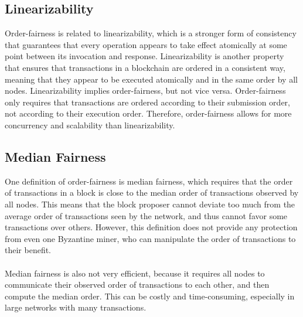 \documentclass{report}
\begin{document}
\subsection*{Linearizability}
Order-fairness is related to linearizability, which is a stronger form of consistency that guarantees that every operation appears to take effect atomically at some point between its invocation and response. Linearizability is another property that ensures that transactions in a blockchain are ordered in a consistent way, meaning that they appear to be executed atomically and in the same order by all nodes. Linearizability implies order-fairness, but not vice versa. Order-fairness only requires that transactions are ordered according to their submission order, not according to their execution order. Therefore, order-fairness allows for more concurrency and scalability than linearizability. 
\subsection*{Median Fairness}
One definition of order-fairness is median fairness, which requires that the order of transactions in a block is close to the median order of transactions observed by all nodes. This means that the block proposer cannot deviate too much from the average order of transactions seen by the network, and thus cannot favor some transactions over others. However, this definition does not provide any protection from even one Byzantine miner, who can manipulate the order of transactions to their benefit.\\\\
Median fairness is also not very efficient, because it requires all nodes to communicate their observed order of transactions to each other, and then compute the median order. This can be costly and time-consuming, especially in large networks with many transactions. 
\end{document}
